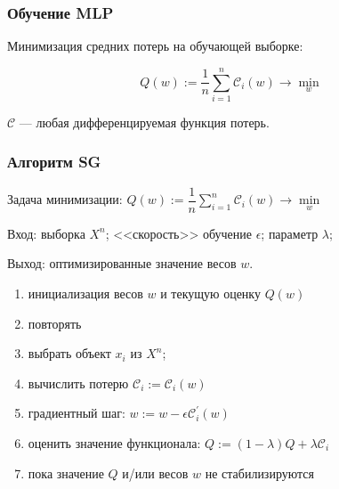 \documentclass[11pt]{beamer}
\begin{document}
	\begin{frame}
		\frametitle{Обучение MLP}
		
		\begin{figure}[h]
		\end{figure}
		
		Минимизация средних потерь на обучающей выборке:
		
		$$ Q(w) := \dfrac{1}{n} \sum\limits_{i=1}^{n} \mathcal{C}_i(w) \rightarrow \min\limits_w  $$
		
		$\mathcal{C}$ --- любая дифференцируемая функция потерь.
		
	\end{frame}

	\begin{frame}
		\frametitle{Алгоритм SG}
		
		
		{\color{blue}Задача минимизации:} $ Q(w) := \dfrac{1}{n} \sum\limits_{i=1}^{n} \mathcal{C}_i(w) \rightarrow \min\limits_w  $
		
		{\color{blue} Вход:} выборка $X^n$; <<скорость>> обучение $\epsilon$; параметр $\lambda$;
		
		{\color{blue} Выход:} оптимизированные значение весов $w$.
		
		\begin{enumerate}
			\item инициализация весов $w$ и текущую оценку $Q(w)$
			\item {\color{blue} повторять}
			\item выбрать объект $x_i$ из $X^n$;
			\item вычислить потерю $\mathcal{C}_i := \mathcal{C}_i(w)$
			\item градиентный шаг: $w := w - \epsilon \mathcal{C}_i^{'}(w)$
			\item оценить значение функционала: $Q := (1-\lambda)Q + \lambda \mathcal{C}_i$
			\item {\color{blue} пока} значение $Q$ и/или весов $w$ не стабилизируются
		\end{enumerate}	
		
		
	\end{frame}
\end{document}
